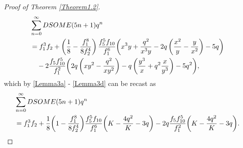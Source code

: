 \documentclass[10pt,a4paper]{amsart}
\begin{document}
\begin{proof}[Proof of Theorem \ref{Theorem1.2}]
\begin{align*}
&\sum_{n=0}^{\infty}DSOME(5n+1)q^n\notag\\
&=f_{1}^{3}f_{2}+\left(\frac{1}{8}-\frac{f_{1}^{8}}{8f_{2}^{4}}\right)\frac{f_{5}^{5}f_{10}}{f_{1}^{6}}\bigg(x^{3}y+\frac{q^2}{x^{3}y}-2q\left(\frac{x^2}{y}-\frac{y}{x^2}\right)
-5q\bigg)\\
&\quad-2\frac{f_{5}f_{10}^{5}}{f_{1}^{2}}\bigg(2q\left(xy^2-\frac{q^2}{xy^2}\right)-q\left(\frac{y^3}{x}+q^2\frac{x}{y^3}\right)
-5q^2\bigg),\end{align*}
which by \eqref{Lemma3a} - \eqref{Lemma3d} can be recast as
\begin{align}
\label{e1}&\sum_{n=0}^{\infty}DSOME(5n+1)q^n\\
&=f_1^3f_2+\frac{1}{8}\bigg(1-\frac{f_{1}^{8}}{8f_{2}^{4}}\bigg)\frac{f_{5}^{5}f_{10}}{f_{1}^{6}}\bigg(K-\frac{4q^2}{K}-3q\bigg)-2q\frac{f_{5}f_{10}^{5}}{f_{1}^{2}}
\bigg(K-\frac{4q^2}{K}-3q\bigg)\notag.
    \end{align}


\end{proof}
\end{document}
